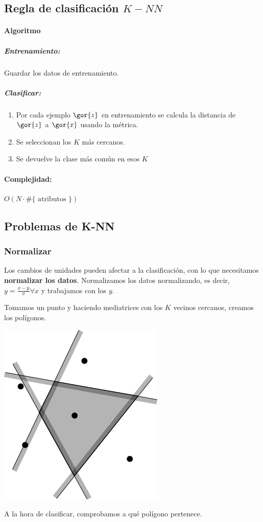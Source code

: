 \documentclass{apuntes}
\begin{document}
\subsection{Regla de clasificación $K-NN$}

\paragraph{Algoritmo}
\subparagraph*{Entrenamiento:} Guardar los datos de entrenamiento.
\subparagraph*{Clasificar:}
\begin{enumerate}
	\item Por cada ejemplo $\gor{z}$ en entrenamiento se calcula la distancia de $\gor{z}$ a $\gor{x}$ usando la métrica.
	\item Se seleccionan los $K$ más cercanos.
	\item Se devuelve la clase más común en esos $K$
\end{enumerate}
\paragraph{Complejidad: } $O(N·\#\{\text{ atributos }\})$

\subsection{Problemas de K-NN}

\subsubsection{Normalizar}
Los cambios de unidades pueden afectar a la clasificación, con lo que necesitamos \textbf{normalizar los datos}. Normalizamos los datos normalizando, es decir, $ y = \frac{x - µ}{σ} ∀x$ y trabajamos con los $y$.


\begin{defn}
Tomamos un punto y haciendo mediatrices con los $K$ vecinos cercanos, creamos los polígonos.
\begin{center}
\includegraphics[scale=0.5]{img/Voronoi_cell.png}
\end{center}

A la hora de clasificar, comprobamos a qué polígono pertenece.
\end{defn}
\end{document}
